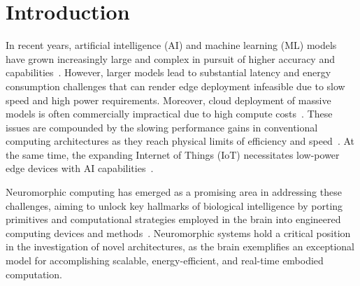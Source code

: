 
\section*{Introduction} %



In recent years, artificial intelligence (AI) and machine learning (ML) models have grown increasingly large and complex in pursuit of higher accuracy and capabilities~\cite{?}. However, larger models lead to substantial latency and energy consumption challenges that can render edge deployment infeasible due to slow speed and high power requirements. Moreover, cloud deployment of massive models is often commercially impractical due to high compute costs~\cite{?}. These issues are compounded by the slowing performance gains in conventional computing architectures as they reach physical limits of efficiency and speed~\cite{?}. At the same time, the expanding Internet of Things (IoT) necessitates low-power edge devices with AI capabilities~\cite{?}. 

Neuromorphic computing has emerged as a promising area in addressing these challenges, aiming to unlock key hallmarks of biological intelligence by porting primitives and computational strategies employed in the brain into engineered computing devices and methods~\cite{Schuman2022, james17historical, thakur2018largescale}.
Neuromorphic systems hold a critical position in the investigation of novel architectures, as the brain exemplifies an exceptional model for accomplishing scalable, energy-efficient, and real-time embodied computation.

